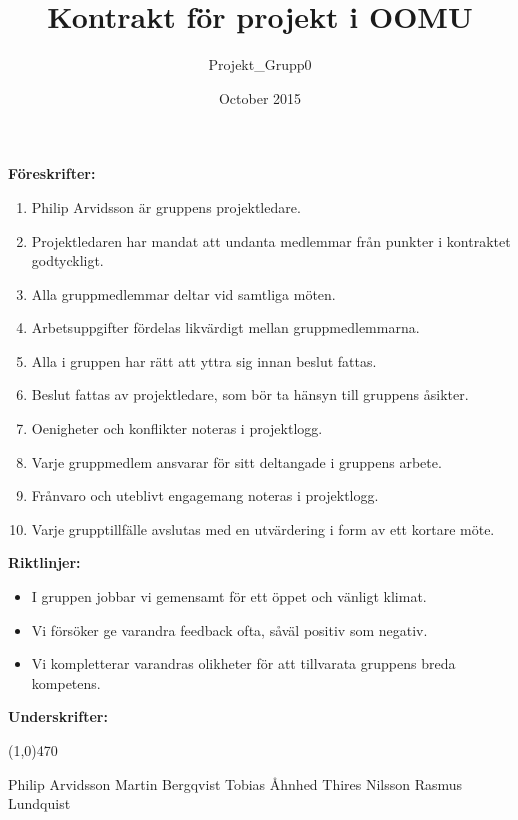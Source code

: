 \documentclass[a4paper]{article}
\title{Kontrakt för projekt i OOMU}
\author{Projekt\_Grupp0}
\date{October 2015}
\begin{document}
    \maketitle

    \vspace{1cm}
    \large \textbf{Föreskrifter:}
    \normalsize
    \begin{enumerate}
        \setlength{\itemindent}{0.5cm}
        \item Philip Arvidsson är gruppens projektledare.
        \item Projektledaren har mandat att undanta medlemmar från punkter i kontraktet godtyckligt.
        \item Alla gruppmedlemmar deltar vid samtliga möten.
        \item Arbetsuppgifter fördelas likvärdigt mellan gruppmedlemmarna.
        \item Alla i gruppen har rätt att yttra sig innan beslut fattas.
        \item Beslut fattas av projektledare, som bör ta hänsyn till gruppens åsikter.
        \item Oenigheter och konflikter noteras i projektlogg.
        \item Varje gruppmedlem ansvarar för sitt deltangade i gruppens arbete.
        \item Frånvaro och uteblivt engagemang noteras i projektlogg.
        \item Varje grupptillfälle avslutas med en utvärdering i form av ett kortare möte.
    \end{enumerate}
    \vspace{1cm}
    \large \textbf{Riktlinjer:}
    \normalsize
    \begin{itemize}
        \setlength{\itemindent}{0.5cm}
        \item I gruppen jobbar vi gemensamt för ett öppet och vänligt klimat.
        \item Vi försöker ge varandra feedback ofta, såväl positiv som negativ.
        \item Vi kompletterar varandras olikheter för att tillvarata gruppens breda kompetens.
    \end{itemize}
    \vspace{2cm}
    \large \textbf{Underskrifter:}
    \vspace{1cm}
    \begin{center}
    \line(1,0){470}
    \end{center}

    \small
    Philip Arvidsson \qquad Martin Bergqvist \qquad Tobias Åhnhed \qquad Thires Nilsson \qquad Rasmus Lundquist
\end{document}
